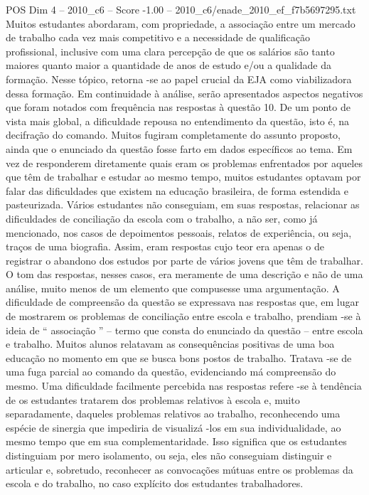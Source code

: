 \begin{textsample}{POS Dim 4 – 2010\_c6 – Score -1.00 – 2010\_c6/enade\_2010\_ef\_f7b5697295.txt}
Muitos estudantes abordaram, com propriedade, a associação entre um mercado de trabalho cada vez mais competitivo e a necessidade de qualificação profissional, inclusive com uma clara percepção de que os salários são tanto maiores quanto maior a quantidade de anos de estudo e/ou a qualidade da formação.
Nesse tópico, retorna -se ao papel crucial da EJA como viabilizadora dessa formação.
Em continuidade à análise, serão apresentados aspectos negativos que foram notados com frequência nas respostas à questão 10.
De um ponto de vista mais global, a dificuldade repousa no entendimento da questão, isto é, na decifração do comando.
Muitos fugiram completamente do assunto proposto, ainda que o enunciado da questão fosse farto em dados específicos ao tema.
Em vez de responderem diretamente quais eram os problemas enfrentados por aqueles que têm de trabalhar e estudar ao mesmo tempo, muitos estudantes optavam por falar das dificuldades que existem na educação brasileira, de forma estendida e pasteurizada.
Vários estudantes não conseguiam, em suas respostas, relacionar as dificuldades de conciliação da escola com o trabalho, a não ser, como já mencionado, nos casos de depoimentos pessoais, relatos de experiência, ou seja, traços de uma biografia.
Assim, eram respostas cujo teor era apenas o de registrar o abandono dos estudos por parte de vários jovens que têm de trabalhar.
O tom das respostas, nesses casos, era meramente de uma descrição e não de uma análise, muito menos de um elemento que compusesse uma argumentação.
A dificuldade de compreensão da questão se expressava nas respostas que, em lugar de mostrarem os problemas de conciliação entre escola e trabalho, prendiam -se à ideia de “ associação ” – termo que consta do enunciado da questão – entre escola e trabalho.
Muitos alunos relatavam as consequências positivas de uma boa educação no momento em que se busca bons postos de trabalho.
Tratava -se de uma fuga parcial ao comando da questão, evidenciando má compreensão do mesmo.
Uma dificuldade facilmente percebida nas respostas refere -se à tendência de os estudantes tratarem dos problemas relativos à escola e, muito separadamente, daqueles problemas relativos ao trabalho, reconhecendo uma espécie de sinergia que impediria de visualizá -los em sua individualidade, ao mesmo tempo que em sua complementaridade.
Isso significa que os estudantes distinguiam por mero isolamento, ou seja, eles não conseguiam distinguir e articular e, sobretudo, reconhecer as convocações mútuas entre os problemas da escola e do trabalho, no caso explícito dos estudantes trabalhadores.

\end{textsample}
